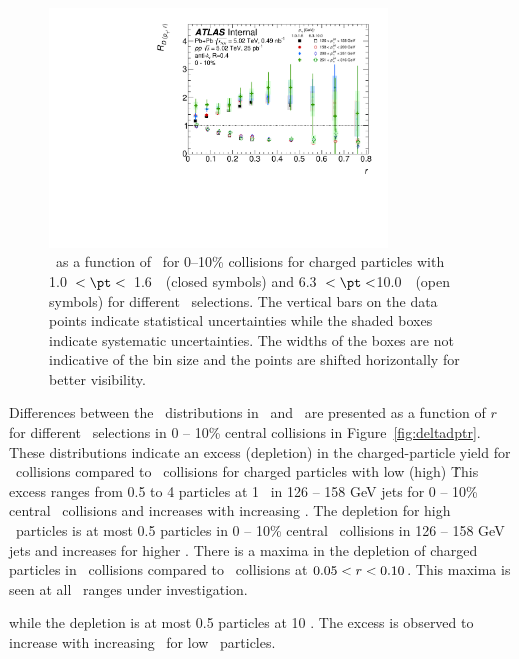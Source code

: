 \begin{figure}[ht]
\centerline{
\includegraphics[width=0.8\textwidth]{figures/results/RDpT_dR_trk2_trk6_cent0.pdf} 
}
\caption{\RDptr\ as a function of \rvar\ for 0--10\% collisions for charged particles with 1.0~$< \pt <$~1.6~\GeV\
(closed symbols) and 6.3~$< \pt <$10.0~\GeV\ (open symbols) for different \ptjet\ selections. The vertical bars on the data points indicate statistical uncertainties while the shaded boxes indicate systematic uncertainties. The widths of the boxes are not indicative of the bin size and the points are shifted horizontally for better visibility.}
\label{fig:ptjetdep}
\end{figure}



Differences between the \Dptr\ distributions in \pbpb\ and \pp\ are presented as a function of $r$ for different \pt\ selections in 0 -- 10\% central collisions in Figure~\ref{fig:deltadptr}. 
These distributions indicate an excess (depletion) in the charged-particle yield for \pbpb\ collisions compared to \pp\ collisions for charged particles with low (high) \pt\. This excess ranges from 0.5 to 4 particles at 1 \GeV\ in 126 -- 158 GeV jets for 0 -- 10\% central \pbpb\ collisions and increases with increasing \ptjet. The depletion for high \pt\ particles is at most 0.5 particles in 0 -- 10\% central \pbpb\ collisions in 126 -- 158 GeV jets and increases for higher \ptjet. There is a maxima in the depletion of charged particles in \pbpb\ collisions compared to \pp\ collisions at $0.05 < \mbox{$r$} < 0.10$. This maxima is seen at all \ptjet\ ranges under investigation.

    while the depletion is at most 0.5 particles at 10 \GeV. The excess is observed to increase with increasing \ptjet\ for low \pt\ particles.


